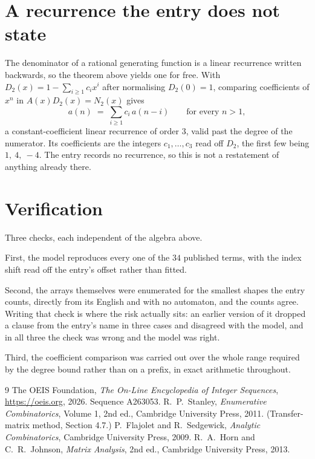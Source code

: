 \documentclass[11pt,a4paper]{article}
\theoremstyle{plain}
\theoremstyle{definition}
\begin{document}
\section{A recurrence the entry does not state}

The denominator of a rational generating function is a linear recurrence written backwards, so
the theorem above yields one for free. With $D_2(x)=1-\sum_{i\ge1}c_ix^i$ after normalising
$D_2(0)=1$, comparing coefficients of $x^n$ in $A(x)D_2(x)=N_2(x)$ gives
\[
a(n)\;=\;\sum_{i\ge1}c_i\,a(n-i)\qquad\text{for every }n>1,
\]
a constant-coefficient linear recurrence of order $3$, valid past the degree of the
numerator. Its coefficients are the integers $c_1,\dots,c_{3}$ read off $D_2$, the first few being $1,\ 4,\ -4$. The entry records no recurrence, so this is not a restatement of anything
already there.

\section{Verification}

Three checks, each independent of the algebra above.

First, the model reproduces every one of the $34$ published terms, with the index shift
read off the entry's offset rather than fitted.

Second, the arrays themselves were enumerated for the smallest shapes the entry counts,
directly from its English and with no automaton, and the counts agree. Writing that check is
where the risk actually sits: an earlier version of it dropped a clause from the entry's name
in three cases and disagreed with the model, and in all three the check was wrong and the model
was right.

Third, the coefficient comparison was carried out over the whole range required by the degree
bound rather than on a prefix, in exact arithmetic throughout.

\begin{thebibliography}{9}
 The OEIS Foundation, \emph{The On-Line Encyclopedia of Integer
Sequences}, \url{https://oeis.org}, 2026. Sequence A263053.
 R.~P.~Stanley, \emph{Enumerative Combinatorics}, Volume 1, 2nd ed.,
Cambridge University Press, 2011. (Transfer-matrix method, Section 4.7.)
 P.~Flajolet and R.~Sedgewick, \emph{Analytic Combinatorics}, Cambridge
University Press, 2009.
 R.~A.~Horn and C.~R.~Johnson, \emph{Matrix Analysis}, 2nd ed., Cambridge
University Press, 2013.
\end{thebibliography}
\end{document}
